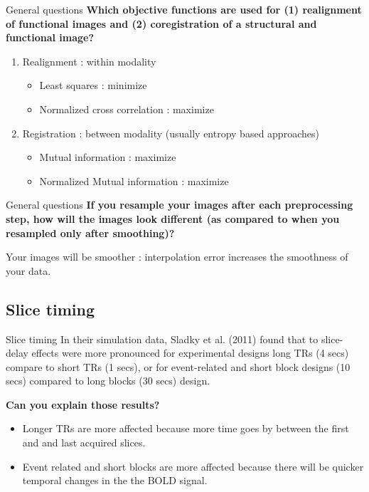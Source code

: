 \documentclass{beamer}
\begin{document}
\begin{frame}{General questions}
\textbf{Which objective functions are used for (1) realignment of functional images and (2) coregistration of a structural and functional image? }

\smallskip    
    \begin{enumerate}
     
     \item Realignment : within modality
      \begin{itemize}\footnotesize
	\item Least squares : minimize
	\item Normalized cross correlation : maximize
      \end{itemize}
      
     \item Registration : between modality (usually entropy based approaches)
      \begin{itemize}\footnotesize
	\item Mutual information : maximize
	\item Normalized Mutual information : maximize
      \end{itemize}     
    \end{enumerate} 
\end{frame}


\begin{frame}{General questions}
\textbf{If you resample your images after each preprocessing step, how will the images look different (as compared to when you resampled only after smoothing)?}

\smallskip  
Your images will be smoother : interpolation error increases the smoothness of your data.

\end{frame}


\subsection[Slice timing]{Slice timing}

\begin{frame}{Slice timing}
In their simulation data, Sladky et al. (2011) found that to slice-delay effects were more pronounced for experimental designs long TRs (4 secs) compare to short TRs (1 secs), or for event-related and short block designs (10 secs) compared to long blocks (30 secs) design.

\smallskip
\textbf{Can you explain those results?}

\smallskip    
  \begin{itemize}
      \item Longer TRs are more affected because more time goes by between the first and and last acquired slices.
      \item Event related and short blocks are more affected because there will be quicker temporal changes in the the BOLD signal.
  \end{itemize}


\end{frame}
\end{document}

